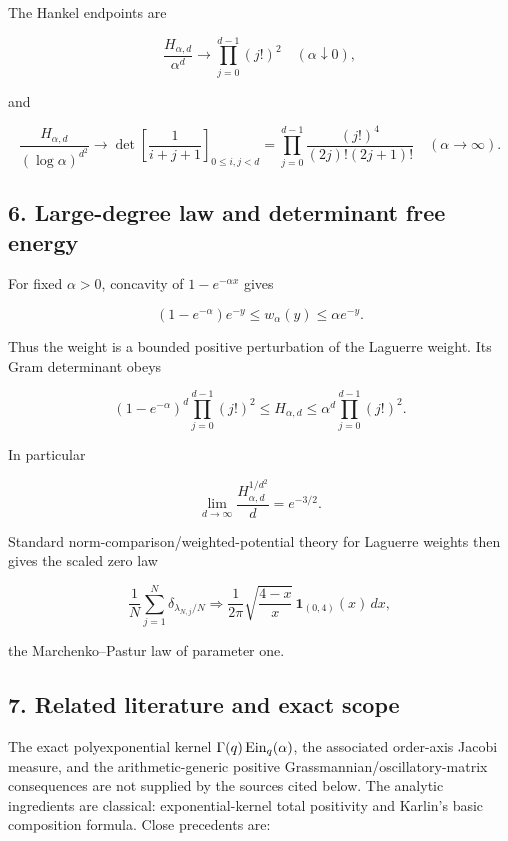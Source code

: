 The Hankel endpoints are

\[
\frac{H_{\alpha,d}}{\alpha^d}\to\prod_{j=0}^{d-1}(j!)^2
\quad(\alpha\downarrow0),
\]

and

\[
\frac{H_{\alpha,d}}{(\log\alpha)^{d^2}}
\to\det\left[\frac1{i+j+1}\right]_{0\le i,j<d}
=\prod_{j=0}^{d-1}\frac{(j!)^4}{(2j)!(2j+1)!}
\quad(\alpha\to\infty).
\]

\subsection{6. Large-degree law and determinant free energy}

For fixed \(\alpha>0\), concavity of \(1-e^{-\alpha x}\) gives

\[
(1-e^{-\alpha})e^{-y}\le w_\alpha(y)\le\alpha e^{-y}. \tag{TP-8}
\]

Thus the weight is a bounded positive perturbation of the Laguerre weight.
Its Gram determinant obeys

\[
(1-e^{-\alpha})^d\prod_{j=0}^{d-1}(j!)^2
\le H_{\alpha,d}\le
\alpha^d\prod_{j=0}^{d-1}(j!)^2. \tag{TP-9}
\]

In particular

\[
\lim_{d\to\infty}\frac{H_{\alpha,d}^{1/d^2}}d=e^{-3/2}. \tag{TP-10}
\]

Standard norm-comparison/weighted-potential theory for Laguerre weights
then gives the scaled zero law

\[
\frac1N\sum_{j=1}^N\delta_{\lambda_{N,j}/N}
\Longrightarrow
\frac1{2\pi}\sqrt{\frac{4-x}{x}}\,\mathbf1_{(0,4)}(x)\,dx,
\]

the Marchenko--Pastur law of parameter one.

\subsection{7. Related literature and exact scope}

The exact polyexponential kernel \(\Gamma(q)\operatorname{Ein}_q(\alpha)\), the associated
order-axis Jacobi measure, and the arithmetic-generic positive
Grassmannian/oscillatory-matrix consequences are not supplied by the sources
cited below.  The analytic ingredients are
classical: exponential-kernel total positivity and Karlin's basic composition
formula. Close precedents are:


